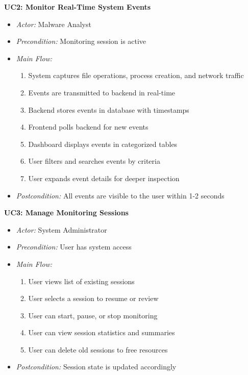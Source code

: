 \textbf{UC2: Monitor Real-Time System Events}
\begin{itemize}
    \item \textit{Actor:} Malware Analyst
    \item \textit{Precondition:} Monitoring session is active
    \item \textit{Main Flow:}
    \begin{enumerate}
        \item System captures file operations, process creation, and network traffic
        \item Events are transmitted to backend in real-time
        \item Backend stores events in database with timestamps
        \item Frontend polls backend for new events
        \item Dashboard displays events in categorized tables
        \item User filters and searches events by criteria
        \item User expands event details for deeper inspection
    \end{enumerate}
    \item \textit{Postcondition:} All events are visible to the user within 1-2 seconds
\end{itemize}

\textbf{UC3: Manage Monitoring Sessions}
\begin{itemize}
    \item \textit{Actor:} System Administrator
    \item \textit{Precondition:} User has system access
    \item \textit{Main Flow:}
    \begin{enumerate}
        \item User views list of existing sessions
        \item User selects a session to resume or review
        \item User can start, pause, or stop monitoring
        \item User can view session statistics and summaries
        \item User can delete old sessions to free resources
    \end{enumerate}
    \item \textit{Postcondition:} Session state is updated accordingly
\end{itemize}


